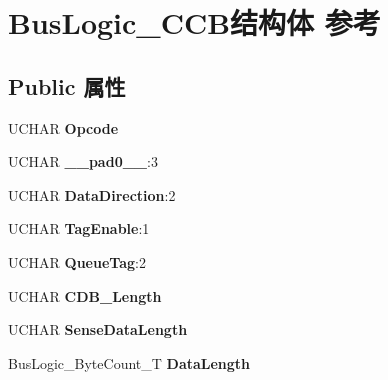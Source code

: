\hypertarget{struct_bus_logic___c_c_b}{}\section{Bus\+Logic\+\_\+\+C\+C\+B结构体 参考}
\label{struct_bus_logic___c_c_b}
\subsection*{Public 属性}
\begin{DoxyCompactItemize}
\item 
\mbox{\label{struct_bus_logic___c_c_b_a67e19e7806a082de2a14f544124c4b99}} 
U\+C\+H\+AR {\bfseries Opcode}
\item 
\mbox{\label{struct_bus_logic___c_c_b_a3b49a09ca53769c7ebb3d75a3806ddf1}} 
U\+C\+H\+AR {\bfseries \+\_\+\+\_\+pad0\+\_\+\+\_\+}\+:3
\item 
\mbox{\label{struct_bus_logic___c_c_b_a7b2efc9f8abbf4979005b0eb4bc7e7c9}} 
U\+C\+H\+AR {\bfseries Data\+Direction}\+:2
\item 
\mbox{\label{struct_bus_logic___c_c_b_a961dfc3bf842e68f1de3fe8fbd26c2f2}} 
U\+C\+H\+AR {\bfseries Tag\+Enable}\+:1
\item 
\mbox{\label{struct_bus_logic___c_c_b_af82d0a6beb7146dcbb46a8202edadff0}} 
U\+C\+H\+AR {\bfseries Queue\+Tag}\+:2
\item 
\mbox{\label{struct_bus_logic___c_c_b_a943cd1dc8cf1f4615396c05ae0b61e73}} 
U\+C\+H\+AR {\bfseries C\+D\+B\+\_\+\+Length}
\item 
\mbox{\label{struct_bus_logic___c_c_b_a6fbd7e7e1d275ae190ec377d0977873d}} 
U\+C\+H\+AR {\bfseries Sense\+Data\+Length}
\item 
\mbox{\label{struct_bus_logic___c_c_b_a8ca981db5844faec957d2511124d43c6}} 
Bus\+Logic\+\_\+\+Byte\+Count\+\_\+T {\bfseries Data\+Length}
\item 
\mbox{\label{struct_bus_logic___c_c_b_a943a01b17fdff07462e71312c6c770f1}} 

\end{DoxyCompactItemize}
